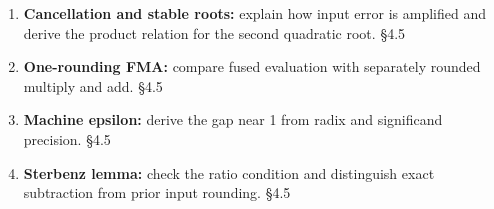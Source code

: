 \documentclass[11pt]{article}
\begin{document}
\begin{keepsection}
\begin{enumerate}
\item \textbf{Cancellation and stable roots:} explain how input error is amplified and derive the product relation for the second quadratic root. \hfill{\small\color{FAUblue}§4.5}
\item \textbf{One-rounding FMA:} compare fused evaluation with separately rounded multiply and add. \hfill{\small\color{FAUblue}§4.5}
\item \textbf{Machine epsilon:} derive the gap near 1 from radix and significand precision. \hfill{\small\color{FAUblue}§4.5}
\item \textbf{Sterbenz lemma:} check the ratio condition and distinguish exact subtraction from prior input rounding. \hfill{\small\color{FAUblue}§4.5}
\end{enumerate}
\end{keepsection}
\end{document}
